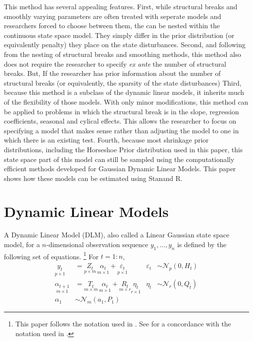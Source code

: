 \documentclass{article}
\newcommand{\paren}[1]{\ensuremath{\left(#1\right)}}
\newcommand{\dmvnorm}[2]{\ensuremath{\mathcal{N}_{#2}\paren{#1}}}
\newcommand{\RLang}{\textsf{R}}
\newcommand{\Stan}{Stan}
\begin{document}
This method has several appealing features.
First, while structural breaks and smoothly varying parameters are often treated with seperate models and researchers forced to choose between them, the can be nested within the continuous state space model.
They simply differ in the prior distribution (or equivalently penalty) they place on the state disturbances.
Second, and following from the nesting of structural breaks and smoothing methods, this method also does not require the researcher to specify \textit{ex ante} the number of structural breaks.
But, If the researcher has prior information about the number of structural breaks (or equivalently, the sparsity of the state disturbances)
Third, because this method is a subclass of the dynamic linear models, it inherits much of the flexibility of those models.
With only minor modifications, this method can be applied to problems in which the structural break is in the slope, regression coefficients, seasonal and cylical effects.
This allows the researcher to focus on specifying a model that makes sense rather than adjusting the model to one in which there is an existing test.
Fourth, because most shrinkage prior distributions, including the Horseshoe Prior distribution used in this paper, this state space part of this model can still be sampled using the computationally efficient methods developed for Gaussian Dynamic Linear Models.
This paper shows how these models can be estimated using \Stan and \RLang.

\section{Dynamic Linear Models}
\label{sec:dynam-line-models}

A Dynamic Linear Model (DLM), also called a Linear Gaussian state space model, for a $n$-dimensional observation sequence $y_{1}, \dots, y_{n}$ is defined by the following set of equations.%
\footnote{This paper follows the notation used in \textcite{DurbinKoopman2001}. See \textcite{PetrisPetroneEtAl2009} for a concordance with the notation used in \textcite{WestHarrison1997}.}
For $t = 1:n$,
\begin{align}
  \label{eq:8}
  \underset{p \times 1}{y_t} &= \underset{p \times m}{Z_{t}} \, \underset{m \times 1}{\alpha_t} + \underset{p \times 1}{\varepsilon_t} & \varepsilon_{t} &\sim \dmvnorm{0, H_{t}}{p} \\
  \label{eq:14}
  \underset{m \times 1}{\alpha_{t+1}} &= \underset{m \times m}{T_{t}} \, \underset{m \times 1}{\alpha_{t}} + \underset{m \times r}{R_{t}}  \underset{r \times 1}{\eta_{t}} & \eta_{t} &\sim \dmvnorm{0, Q_{t}}{r} \\
  \label{eq:2}
  \alpha_{1} & \sim \dmvnorm{a_{1}, P_{1}}{m}
\end{align}
\end{document}

